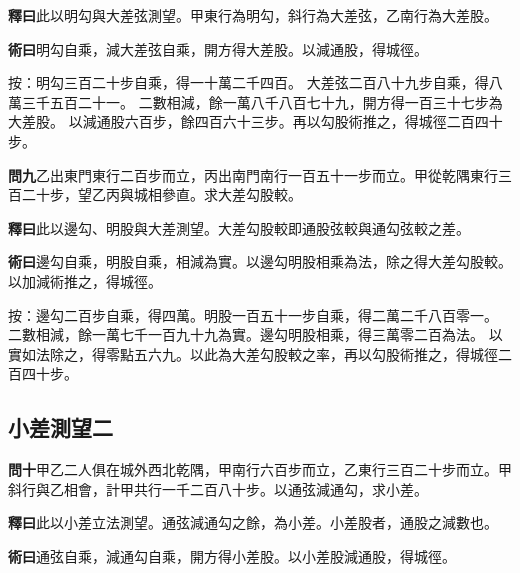 \documentclass[12pt,a4paper]{article}
\newcommand{\Section}[1]{\subsection*{#1}}
\begin{document}
\noindent\textbf{釋曰}\quad 此以明勾與大差弦測望。甲東行為明勾，斜行為大差弦，乙南行為大差股。

\vspace{0.3em}

\noindent\textbf{術曰}\quad 明勾自乘，減大差弦自乘，開方得大差股。以減通股，得城徑。

\vspace{0.3em}

\noindent
按：明勾三百二十步自乘，得一十萬二千四百。
大差弦二百八十九步自乘，得八萬三千五百二十一。
二數相減，餘一萬八千八百七十九，開方得一百三十七步為大差股。
以減通股六百步，餘四百六十三步。再以勾股術推之，得城徑二百四十步。

\vspace{0.5em}

\noindent\textbf{問九}\quad 乙出東門東行二百步而立，丙出南門南行一百五十一步而立。甲從乾隅東行三百二十步，望乙丙與城相參直。求大差勾股較。

\vspace{0.3em}

\noindent\textbf{釋曰}\quad 此以邊勾、明股與大差測望。大差勾股較即通股弦較與通勾弦較之差。

\vspace{0.3em}

\noindent\textbf{術曰}\quad 邊勾自乘，明股自乘，相減為實。以邊勾明股相乘為法，除之得大差勾股較。以加減術推之，得城徑。

\vspace{0.3em}

\noindent
按：邊勾二百步自乘，得四萬。明股一百五十一步自乘，得二萬二千八百零一。
二數相減，餘一萬七千一百九十九為實。邊勾明股相乘，得三萬零二百為法。
以實如法除之，得零點五六九。以此為大差勾股較之率，再以勾股術推之，得城徑二百四十步。

\Section{小差測望二}

\noindent\textbf{問十}\quad 甲乙二人俱在城外西北乾隅，甲南行六百步而立，乙東行三百二十步而立。甲斜行與乙相會，計甲共行一千二百八十步。以通弦減通勾，求小差。

\vspace{0.3em}

\noindent\textbf{釋曰}\quad 此以小差立法測望。通弦減通勾之餘，為小差。小差股者，通股之減數也。

\vspace{0.3em}

\noindent\textbf{術曰}\quad 通弦自乘，減通勾自乘，開方得小差股。以小差股減通股，得城徑。
\end{document}
